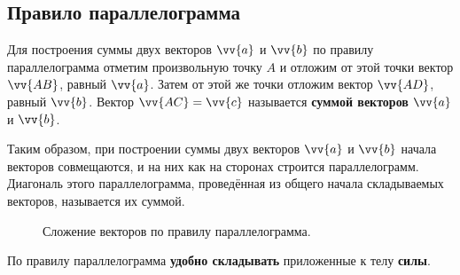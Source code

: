 \clearpage

\subsection{Правило параллелограмма}
Для построения суммы двух векторов $\vv{a}$ и $\vv{b}$
по правилу параллелограмма отметим произвольную точку $A$
и отложим от этой точки вектор $\vv{AB}$, равный $\vv{a}$.
Затем от этой же точки отложим вектор $\vv{AD}$, равный $\vv{b}$.
Вектор $\vv{AC}=\vv{c}$ называется \textbf{суммой векторов} $\vv{a}$ и $\vv{b}$.

Таким образом, при построении суммы двух векторов $\vv{a}$ и $\vv{b}$
начала векторов совмещаются,
и на них как на сторонах строится параллелограмм. Диагональ этого параллелограмма,
проведённая из общего начала складываемых векторов, называется их суммой.
\begin{figure}[h]
  \centering
  \caption{\small Сложение векторов по правилу параллелограмма.}\label{pic:sum_par}
\end{figure}

По правилу параллелограмма \textbf{удобно складывать}
приложенные к телу
\textbf{силы}.

